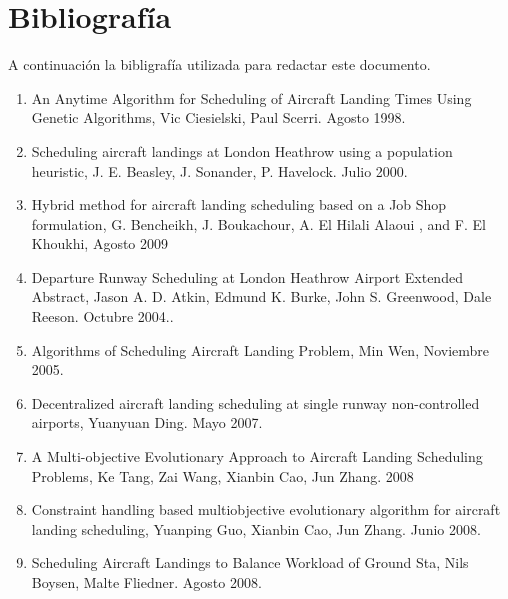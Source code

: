\documentclass[letter, 11pt]{article}
\begin{document}
\section{Bibliografía}
A continuación la bibligrafía utilizada para redactar este documento.
\begin{enumerate}
\item An Anytime Algorithm for Scheduling of Aircraft Landing Times Using Genetic Algorithms, Vic Ciesielski, Paul Scerri. Agosto 1998.
\item Scheduling aircraft landings at London Heathrow using a population heuristic, J. E. Beasley, J. Sonander, P. Havelock. Julio 2000.
\item Hybrid method for aircraft landing scheduling based on a Job Shop formulation, G. Bencheikh, J. Boukachour, A. El Hilali Alaoui , and F. El Khoukhi, Agosto 2009
\item Departure Runway Scheduling at London Heathrow Airport Extended Abstract, Jason A. D. Atkin, Edmund K. Burke, John S. Greenwood, Dale Reeson. Octubre 2004..
\item Algorithms of Scheduling Aircraft Landing Problem, Min Wen, Noviembre 2005.
\item Decentralized aircraft landing scheduling at single runway non-controlled airports, Yuanyuan Ding. Mayo 2007.
\item A Multi-objective Evolutionary Approach to Aircraft Landing Scheduling Problems, Ke Tang, Zai Wang, Xianbin Cao, Jun Zhang. 2008
\item Constraint handling based multiobjective evolutionary algorithm for aircraft landing scheduling, Yuanping Guo, Xianbin Cao, Jun Zhang. Junio 2008.
\item Scheduling Aircraft Landings to Balance Workload of Ground Sta, Nils Boysen, Malte Fliedner. Agosto 2008.
\end{enumerate}
\end{document}
